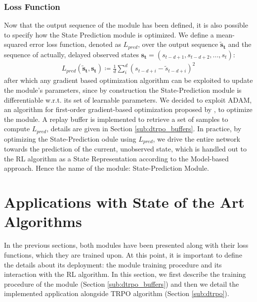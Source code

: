             \subsubsection{Loss Function}
                Now that the output sequence of the module has been defined, it is also possible to specify how the State Prediction module is optimized. We define a mean-squared error loss function, denoted as $L_{pred}$, over the output sequence $\mathbf{\tilde{s}_t}$ and the sequence of actually, delayed observed states $\mathbf{s_t} = (s_{t-d+1}, s_{t-d+2}, ..., s_t)$:
                \begin{align}
                    L_{pred} (\mathbf{\tilde{s}_t}, \mathbf{s_t}) \coloneqq \frac{1}{d} \sum_{i}^{d} \left( s_{t-d+i} - \tilde{s}_{t-d+i}\right)^{2}
                \end{align}
                after which any gradient based optimization algorithm can be exploited to update the module's parameters, since by construction the State-Prediction module is differentiable w.r.t. its set of learnable parameters. We decided to exploit ADAM, an algorithm for first-order gradient-based optimization proposed by , to optimize the module. A replay buffer is implemented to retrieve a set of samples to compute $L_{pred}$, details are given in Section \ref{sub:dtrpo_buffers}. In practice, by optimizing the State-Prediction odule using $L_{pred}$, we drive the entire network towards the prediction of the current, unobserved state, which is handled out to the RL algorithm as a State Representation according to the Model-based approach. Hence the name of the module: State-Prediction Module.
    
    \newpage
    \section{Applications with State of the Art Algorithms}
    \label{ow:application_sota}
        In the previous sections, both modules have been presented along with their loss functions, which they are trained upon. At this point, it is important to define the details about its deployment: the module training procedure and its interaction with the RL algorithm. In this section, we first describe the training procedure of the module (Section \ref{sub:dtrpo_buffers}) and then we detail the implemented application alongside TRPO algorithm (Section \ref{sub:dtrpo}).
        
